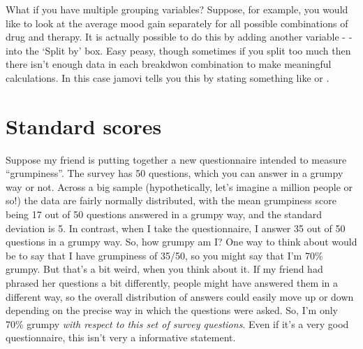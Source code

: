 What if you have multiple grouping variables? Suppose, for example, you would like to look at the average mood gain separately for all possible combinations of drug and therapy. It is actually possible to do this by adding another variable -  - into the `Split by' box. Easy peasy, though sometimes if you split too much then there isn't enough data in each breakdwon combination to make meaningful calculations. In this case jamovi tells you this by stating something like  or . 


\section{Standard scores~\label{sec:zscore}}

Suppose my friend is putting together a new questionnaire intended to measure ``grumpiness''. The survey has 50 questions, which you can answer in a grumpy way or not. Across a big sample (hypothetically, let's imagine a million people or so!) the data are fairly normally distributed, with the mean grumpiness score being 17 out of 50 questions answered in a grumpy way, and the standard deviation is 5. In contrast, when I take the questionnaire, I answer 35 out of 50 questions in a grumpy way. So, how grumpy am I? One way to think about would be to say that I have grumpiness of 35/50, so you might say that I'm 70\% grumpy. But that's a bit weird, when you think about it. If my friend had phrased her questions a bit differently, people might have answered them in a different way, so the overall distribution of answers could easily move up or down depending on the precise way in which the questions were asked. So, I'm only 70\% grumpy {\it with respect to this set of survey questions}. Even if it's a very good questionnaire, this isn't very a informative statement. 

